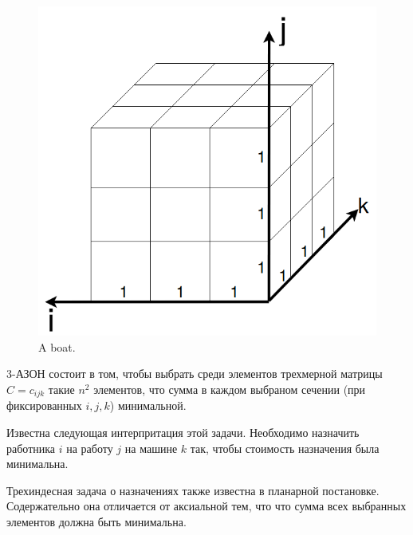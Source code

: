 \begin{figure}[h!]
  \includegraphics[height=0.3\textheight,keepaspectratio]{Chapters/image/example.png}
  \caption{A boat.}
  \label{fig:flowchart}
\end{figure}

3-АЗОН состоит в том, чтобы выбрать среди элементов трехмерной матрицы $C={c_{ijk}}$ такие $n^2$ элементов, что сумма в каждом выбраном сечении (при фиксированных $i,j,k$) минимальной. 

Известна следующая интерпритация этой задачи. Необходимо назначить работника $i$ на работу $j$ на машине $k$ так, 
чтобы стоимость назначения была минимальна.

Трехиндесная задача о назначениях также известна в планарной постановке. Содержательно она отличается от аксиальной тем, что что сумма всех выбранных элементов должна быть минимальна. 
